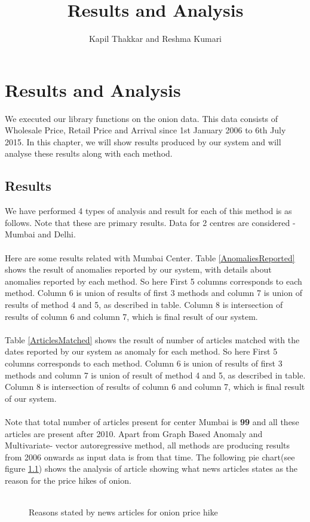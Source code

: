 \documentclass[a4paper,10pt]{report}
\title{Results and Analysis}
\author{Kapil Thakkar and Reshma Kumari}
\begin{document}
\maketitle

\chapter{Results and Analysis}

We executed our library functions on the onion data. This data consists of 
Wholesale Price, Retail Price and Arrival since 1st January 2006 to 6th July 
2015. In this chapter, we will show results produced by our system and will 
analyse these results along with each method.

\section{Results}

We have performed 4 types of analysis and result for each of this method is as 
follows. Note that these are primary results. Data for 2 centres are considered 
- Mumbai and Delhi.\\
\\
Here are some results related with Mumbai Center. Table \ref{AnomaliesReported} shows the result of anomalies reported by our system, with details about anomalies reported by each method. So here First 5 columns corresponds to each method. Column 6 is union of results of first 3 methods and column 7 is union of results of method 4 and 5, as described in table. Column 8 is intersection of results of column 6 and column 7, which is final result of our system.\\
\\
Table \ref{ArticlesMatched} shows the result of number of articles matched with the dates reported by our system as anomaly for each method. So here First 5 columns corresponds to each method. Column 6 is union of results of first 3 methods and column 7 is union of result of method 4 and 5, as described in table. Column 8 is intersection of results of column 6 and column 7, which is final result of our system.\\
\\
Note that total number of articles present for center Mumbai is \textbf{99} and all these articles are present after 2010. Apart from Graph Based Anomaly and Multivariate- vector autoregressive method, all methods are producing results from 2006 onwards as input data is from that time. The following pie chart(see figure \ref{fig:pieReasons}) shows the analysis of article showing what news articles states as the reason for the price hikes of onion.\\
\\
\begin{figure}[H]
\centering
{}
\caption{Reasons stated by news articles for onion price hike}
\label{fig:pieReasons}
\end{figure}
\end{document}
